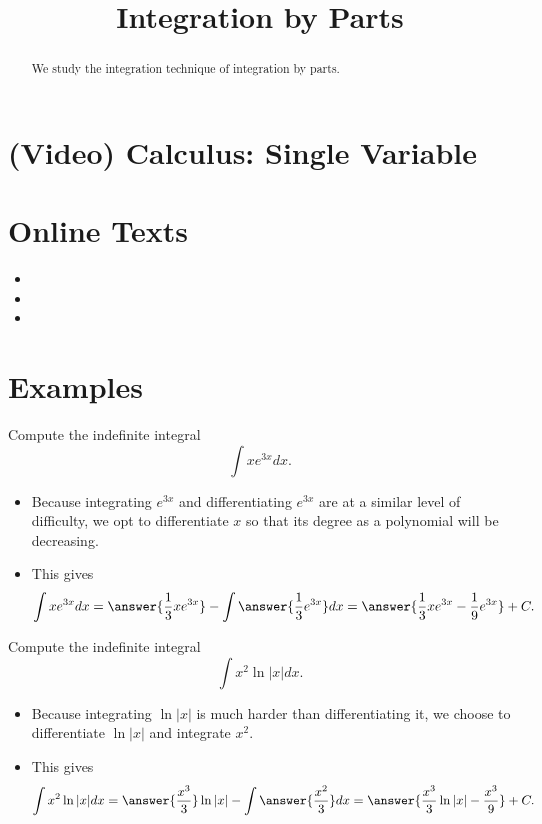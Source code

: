 \documentclass{ximera}
\title{Integration by Parts}
\begin{document}
\begin{abstract}
We study the integration technique of integration by parts.
\end{abstract}
\maketitle

\section*{(Video) Calculus: Single Variable}


\section*{Online Texts}
\begin{itemize}
\item {}
\item {}
\item {}
\end{itemize}

\section*{Examples}


\begin{example}
Compute the indefinite integral
\[ \int x e^{3x} dx. \]
\begin{itemize}
\item Because integrating $e^{3x}$ and differentiating $e^{3x}$ are at a similar level of difficulty, we opt to differentiate $x$ so that its degree as a polynomial will be decreasing.
\item This gives
\[ \int x e^{3x} dx = \answer{\frac{1}{3} x e^{3x}} - \int \answer{ \frac{1}{3} e^{3x} } dx = \answer{ \frac{1}{3} x e^{3x} - \frac{1}{9} e^{3x} } + C. \]
\end{itemize}
\end{example}


\begin{example}
Compute the indefinite integral
\[ \int x^2 \ln |x| dx. \]
\begin{itemize}
\item Because integrating $\ln |x|$ is much harder than differentiating it, we choose to differentiate $\ln |x|$ and integrate $x^2$. 
\item This gives
\[ \int x^2 \ln |x| dx = \answer{\frac{x^3}{3}} \ln |x| - \int \answer{\frac{x^2}{3}} dx = \answer{ \frac{x^3}{3} \ln |x| - \frac{x^3}{9}} + C. \]
\end{itemize}
\end{example}
\end{document}
